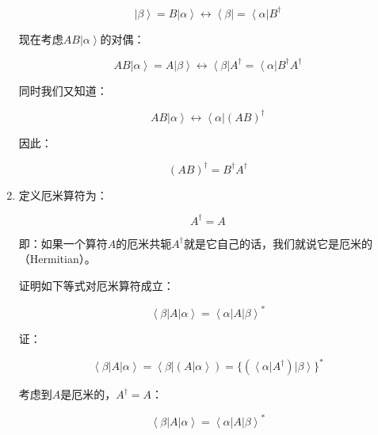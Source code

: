 \begin{enumerate}
\begin{equation}
\left| \beta \right\rangle = B \left| \alpha \right\rangle \leftrightarrow \left\langle \beta \right| = \left\langle \alpha \right| B^\dagger~
\end{equation}

现在考虑$AB \left| \alpha \right\rangle$的对偶：

\begin{equation}
A B \left| \alpha \right\rangle = A \left| \beta \right\rangle \leftrightarrow \left\langle \beta \right| A^\dagger = \left\langle \alpha \right| B^\dagger A^\dagger ~
\end{equation}

同时我们又知道：

\begin{equation}
A B \left| \alpha \right\rangle  \leftrightarrow \left\langle \alpha \right|  \left( AB \right)^\dagger~
\end{equation}

因此：

\begin{equation}
\left(  AB \right)^\dagger = B^\dagger A^\dagger~ 
\end{equation}

\item

定义厄米算符为：

\begin{equation}
A^\dagger = A~
\end{equation}

即：如果一个算符$A$的厄米共轭$A^\dagger $就是它自己的话，我们就说它是厄米的（Hermitian）。

证明如下等式对厄米算符成立：

\begin{equation}
\left\langle \beta \right| A \left| \alpha \right\rangle =  \left\langle \alpha \right| A \left| \beta \right\rangle^*~
\end{equation}

证：

\begin{equation}
\left\langle \beta \right| A \left| \alpha \right\rangle = \left\langle \beta \right|  \left( A \left| \alpha \right\rangle \right)  =   \{ \left(  \left\langle \alpha \right| A^\dagger \right) \left| \beta \right\rangle \}^* ~
\end{equation}

考虑到$A$是厄米的，$A^\dagger = A$：

\begin{equation}
\left\langle \beta \right| A \left| \alpha \right\rangle = \left\langle \alpha \right| A \left| \beta \right\rangle^*~
\end{equation}


\end{enumerate}
